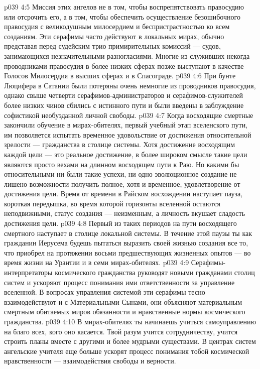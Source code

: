 \vs p039 4:5 Миссия этих ангелов не в том, чтобы воспрепятствовать правосудию или отсрочить его, а в том, чтобы обеспечить осуществление безошибочного правосудия с великодушным милосердием и беспристрастностью ко всем созданиям. Эти серафимы часто действуют в локальных мирах, обычно представая перед судейским трио примирительных комиссий --- судов, занимающихся незначительными разногласиями. Многие из служивших некогда проводниками правосудия в более низких сферах позже выступают в качестве Голосов Милосердия в высших сферах и в Спасограде.
\vs p039 4:6 При бунте Люцифера в Сатании были потеряны очень немногие из проводников правосудия, однако свыше четверти серафимов\hyp{}администраторов и серафимов\hyp{}служителей более низких чинов сбились с истинного пути и были введены в заблуждение софистикой необузданной личной свободы.
\vs p039 4:7 \bibnobreakspace {} Когда восходящие смертные закончили обучение в мирах\hyp{}обителях, первый учебный этап вселенского пути, им позволяется испытать временное удовольствие от достижения относительной зрелости --- гражданства в столице системы. Хотя достижение восходящим каждой цели --- это реальное достижение, в более широком смысле такие цели являются просто вехами на длинном восходящем пути к Раю. Но какими бы относительными ни были такие успехи, ни одно эволюционное создание не лишено возможности получить полное, хотя и временное, удовлетворение от достижения цели. Время от времени в Райском восхождении наступает пауза, короткая передышка, во время которой горизонты вселенной остаются неподвижными, статус создания --- неизменным, а личность вкушает сладость достижения цели.
\vs p039 4:8 Первый из таких периодов на пути восходящего смертного наступает в столице локальной системы. В течение этой паузы ты как гражданин Иерусема будешь пытаться выразить своей жизнью создания все то, что приобрел на протяжении восьми предшествующих жизненных опытов --- во время жизни на Урантии и в семи мирах\hyp{}обителях.
\vs p039 4:9 Серафимы\hyp{}интерпретаторы космического гражданства руководят новыми гражданами столиц систем и ускоряют процесс понимания ими ответственности за управление вселенной. В вопросах управления системой эти серафимы тесно взаимодействуют и с Материальными Сынами, они объясняют материальным смертным обитаемых миров обязанности и нравственные нормы космического гражданства.
\vs p039 4:10 \bibnobreakspace {} В мирах\hyp{}обителях ты начинаешь учиться самоуправлению на благо всех, кого оно касается. Твой разум учится сотрудничеству, учится строить планы вместе с другими и более мудрыми существами. В центрах систем ангельские учителя еще больше ускорят процесс понимания тобой космической нравственности --- взаимодействия свободы и верности.
